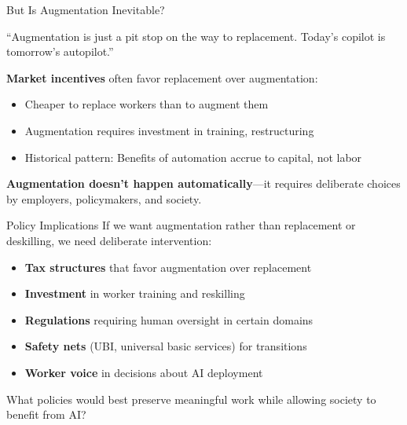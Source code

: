 ﻿\documentclass[aspectratio=169,11pt]{beamer}
\begin{document}
\begin{frame}{But Is Augmentation Inevitable?}
\begin{objectionbox}[Objection]
\small
``Augmentation is just a pit stop on the way to replacement. Today's copilot is tomorrow's autopilot.''
\end{objectionbox}

\vspace{0.2em}
\textbf{Market incentives} often favor replacement over augmentation:
\begin{itemize}
    \item Cheaper to replace workers than to augment them
    \item Augmentation requires investment in training, restructuring
    \item Historical pattern: Benefits of automation accrue to capital, not labor
\end{itemize}

\vspace{0.2em}
\textbf{Augmentation doesn't happen automatically}---it requires deliberate choices by employers, policymakers, and society.
\end{frame}

\begin{frame}{Policy Implications}
If we want augmentation rather than replacement or deskilling, we need deliberate intervention:

\vspace{0.2em}
\begin{itemize}
    \item \textbf{Tax structures} that favor augmentation over replacement
    \item \textbf{Investment} in worker training and reskilling
    \item \textbf{Regulations} requiring human oversight in certain domains
    \item \textbf{Safety nets} (UBI, universal basic services) for transitions
    \item \textbf{Worker voice} in decisions about AI deployment
\end{itemize}

\vspace{0.2em}
\begin{discussionbox}
\small
What policies would best preserve meaningful work while allowing society to benefit from AI?
\end{discussionbox}
\end{frame}
\end{document}
